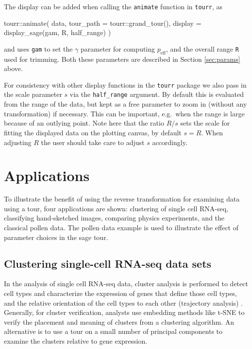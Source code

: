 \documentclass[]{interact}
\theoremstyle{plain}%
\theoremstyle{definition}
\theoremstyle{remark}
\newenvironment{Shaded}{\begin{snugshade}}{\end{snugshade}}
\newcommand{\AttributeTok}[1]{\textcolor[rgb]{0.77,0.63,0.00}{#1}}
\newcommand{\FunctionTok}[1]{\textcolor[rgb]{0.00,0.00,0.00}{#1}}
\newcommand{\NormalTok}[1]{#1}
\newcommand{\SpecialCharTok}[1]{\textcolor[rgb]{0.00,0.00,0.00}{#1}}
\begin{document}
The display can be added when calling the \texttt{animate} function in
\texttt{tourr}, as

\begin{Shaded}
\begin{Highlighting}[]
\NormalTok{tourr}\SpecialCharTok{::}\FunctionTok{animate}\NormalTok{(}
\NormalTok{  data,}
  \AttributeTok{tour\_path =}\NormalTok{ tourr}\SpecialCharTok{::}\FunctionTok{grand\_tour}\NormalTok{(),}
  \AttributeTok{display =} \FunctionTok{display\_sage}\NormalTok{(gam, R, half\_range)}
\NormalTok{  )}
\end{Highlighting}
\end{Shaded}

\noindent and uses \texttt{gam} to set the \(\gamma\) parameter for
computing \(p_{\mathrm{eff}}\), and the overall range \texttt{R} used
for trimming. Both these parameters are described in Section
\ref{sec:params} above.

For consistency with other display functions in the \texttt{tourr}
package we also pass in the scale parameter \(s\) via the
\texttt{half\_range} argument. By default this is evaluated from the
range of the data, but kept as a free parameter to zoom in (without any
transformation) if necessary. This can be important, e.g.~when the range
is large because of an outlying point. Note here that the ratio \(R/s\)
sets the scale for fitting the displayed data on the plotting canvas, by
default \(s = R\). When adjusting \(R\) the user should take care to
adjust \(s\) accordingly.

\hypertarget{sec:application}{%
\section{Applications}\label{sec:application}}

To illustrate the benefit of using the reverse transformation for
examining data using a tour, four applications are shown: clustering of
single cell RNA-seq, classifying hand-sketched images, comparing physics
experiments, and the classical pollen data. The pollen data example is
used to illustrate the effect of parameter choices in the sage tour.

\hypertarget{sec:appl1}{%
\subsection{Clustering single-cell RNA-seq data sets}\label{sec:appl1}}

In the analysis of single cell RNA-seq data, cluster analysis is
performed to detect cell types and characterize the expression of genes
that define those cell types, and the relative orientation of the cell
types to each other (trajectory analysis) \citep{Amezquita2020-at}.
Generally, for cluster verification, analysts use embedding methods like
t-SNE to verify the placement and meaning of clusters from a clustering
algorithm. An alternative is to use a tour on a small number of
principal components to examine the clusters relative to gene
expression.
\end{document}
